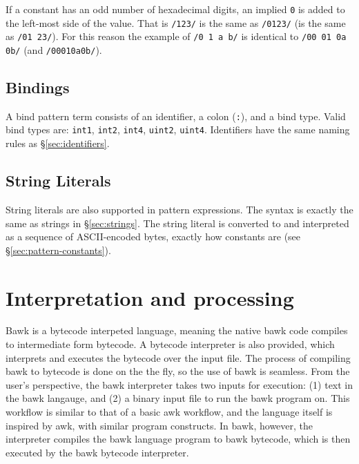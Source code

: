 \documentclass[letterpaper]{article}
\begin{document}
If a constant has an odd number of hexadecimal digits, an implied \texttt{0} is added to the left-most side of the value.  That is \texttt{/123/} is the same as \texttt{/0123/} (is the same as \texttt{/01 23/}).  For this reason the example of \texttt{/0 1 a b/} is identical to \texttt{/00 01 0a 0b/} (and \texttt{/00010a0b/}).
 
\subsection{Bindings}
\label{sec:pattern-bindings}
A bind pattern term consists of an identifier, a colon (\texttt{:}), and a bind type.  Valid bind types are: \texttt{int1}, \texttt{int2}, \texttt{int4}, \texttt{uint2}, \texttt{uint4}.  Identifiers have the same naming rules as \S\ref{sec:identifiers}.

\subsection{String Literals}
String literals are also supported in pattern expressions.  The syntax is exactly the same as strings in \S\ref{sec:strings}.  The string literal is converted to and interpreted as a sequence of ASCII-encoded bytes, exactly how constants are (see \S\ref{sec:pattern-constants}).  

\section{Interpretation and processing}
\label{sec:interpretation}
Bawk is a bytecode interpeted language, meaning the native bawk code compiles to intermediate form bytecode.  A bytecode interpreter is also provided, which interprets and executes the bytecode over the input file.  The process of compiling bawk to bytecode is done on the the fly, so the use of bawk is seamless.  From the user's perspective, the bawk interpreter takes two inputs for execution: (1) text in the bawk langauge, and (2) a binary input file to run the bawk program on.  This workflow is similar to that of a basic awk workflow, and the language itself is inspired by awk, with similar program constructs.  In bawk, however, the interpreter compiles the bawk language program to bawk bytecode, which is then executed by the bawk bytecode interpreter.
\end{document}

